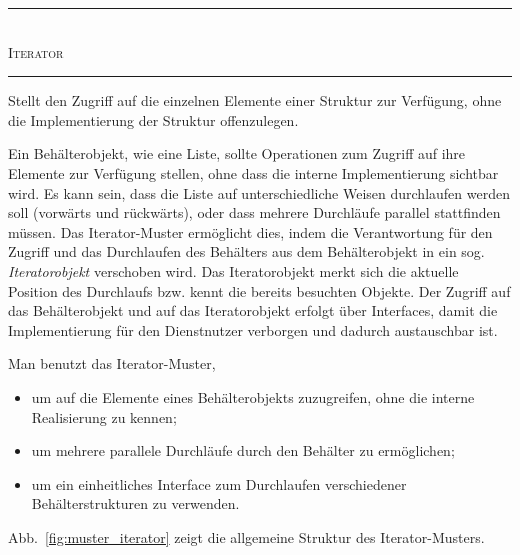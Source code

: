 \vspace{\baselineskip} %

\vspace{\baselineskip}
\textcolor{FernUni-MI-green}{\noindent\rule[1ex]{\textwidth}{2pt}}\\
{\Large \textcolor{FernUni-MI-green}{\textsc{Iterator}}}\\
\textcolor{FernUni-MI-green}{\noindent\rule[1ex]{\textwidth}{2pt}}

\vspace{2mm} %

\begin{description}
	\setlength{\itemsep}{2mm} %
	
	\item[Zweck] Stellt den Zugriff auf die einzelnen Elemente einer Struktur zur Verfügung, ohne die Implementierung der Struktur offenzulegen.
	\item[Motivation] Ein Behälterobjekt, wie \zb eine Liste, sollte Operationen zum Zugriff auf ihre Elemente zur Verfügung stellen, ohne dass die interne Implementierung sichtbar wird. Es kann sein, dass die Liste auf unterschiedliche Weisen durchlaufen werden soll (\zb vorwärts und rückwärts), oder dass mehrere Durchläufe parallel stattfinden müssen.
	Das Iterator-Muster ermöglicht dies, indem die Verantwortung für den Zugriff und das Durchlaufen des Behälters aus dem Behälterobjekt in ein sog. \textit{Iteratorobjekt} verschoben wird. Das Iteratorobjekt merkt sich die aktuelle Position des Durchlaufs bzw. kennt die bereits besuchten Objekte. Der Zugriff auf das Behälterobjekt und auf das Iterator\-objekt erfolgt über Interfaces, damit die Implementierung für den Dienstnutzer verborgen und dadurch austauschbar ist.
	\item[Anwendbarkeit] Man benutzt das Iterator-Muster,
	\begin{itemize}
		\item 	um auf die Elemente eines Behälterobjekts zuzugreifen, ohne die interne Realisierung zu kennen;
		\item 	um mehrere parallele Durchläufe durch den Behälter zu ermöglichen;
		\item 	um ein einheitliches Interface zum Durchlaufen verschiedener Behälterstrukturen zu verwenden.
	\end{itemize}
	\item[Struktur] Abb.~\ref{fig:muster_iterator} zeigt die allgemeine Struktur des Iterator-Musters.


\end{description}
